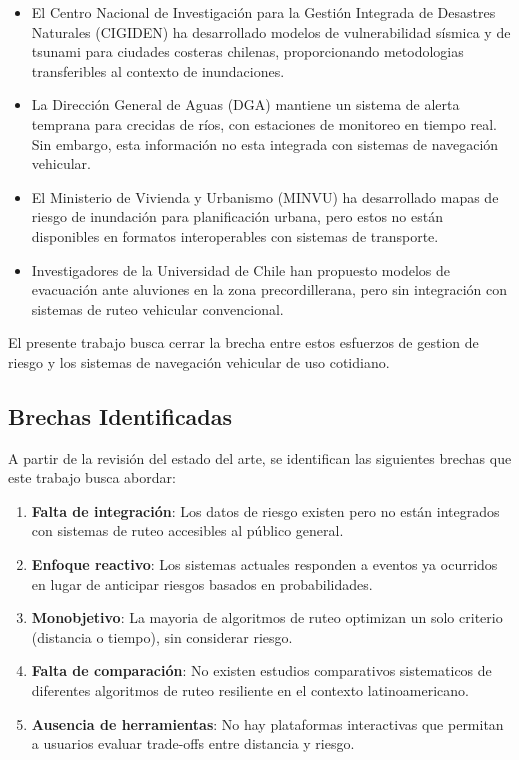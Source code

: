 \documentclass[conference]{IEEEtran}
\begin{document}
\begin{itemize}
    \item El Centro Nacional de Investigación para la Gestión Integrada de Desastres Naturales (CIGIDEN) ha desarrollado modelos de vulnerabilidad sísmica y de tsunami para ciudades costeras chilenas, proporcionando metodologias transferibles al contexto de inundaciones.

    \item La Dirección General de Aguas (DGA) mantiene un sistema de alerta temprana para crecidas de ríos, con estaciones de monitoreo en tiempo real. Sin embargo, esta información no esta integrada con sistemas de navegación vehicular.

    \item El Ministerio de Vivienda y Urbanismo (MINVU) ha desarrollado mapas de riesgo de inundación para planificación urbana, pero estos no están disponibles en formatos interoperables con sistemas de transporte.

    \item Investigadores de la Universidad de Chile han propuesto modelos de evacuación ante aluviones en la zona precordillerana, pero sin integración con sistemas de ruteo vehicular convencional.
\end{itemize}

El presente trabajo busca cerrar la brecha entre estos esfuerzos de gestion de riesgo y los sistemas de navegación vehicular de uso cotidiano.

\subsection{Brechas Identificadas}

A partir de la revisión del estado del arte, se identifican las siguientes brechas que este trabajo busca abordar:

\begin{enumerate}
    \item \textbf{Falta de integración}: Los datos de riesgo existen pero no están integrados con sistemas de ruteo accesibles al público general.

    \item \textbf{Enfoque reactivo}: Los sistemas actuales responden a eventos ya ocurridos en lugar de anticipar riesgos basados en probabilidades.

    \item \textbf{Monobjetivo}: La mayoria de algoritmos de ruteo optimizan un solo criterio (distancia o tiempo), sin considerar riesgo.

    \item \textbf{Falta de comparación}: No existen estudios comparativos sistematicos de diferentes algoritmos de ruteo resiliente en el contexto latinoamericano.

    \item \textbf{Ausencia de herramientas}: No hay plataformas interactivas que permitan a usuarios evaluar trade-offs entre distancia y riesgo.
\end{enumerate}
\end{document}
